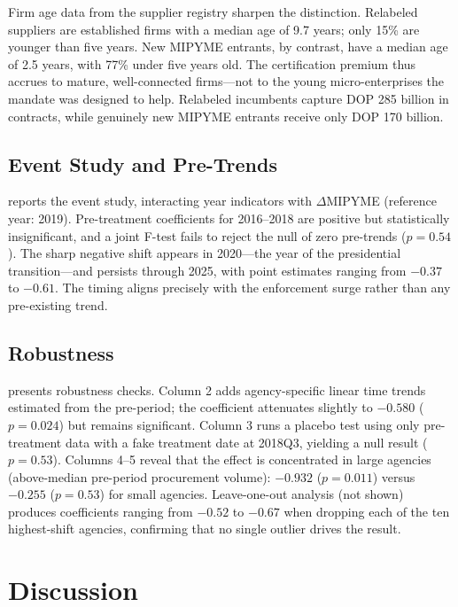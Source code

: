 \documentclass[12pt]{article}
\begin{document}
Firm age data from the supplier registry sharpen the distinction. Relabeled suppliers are established firms with a median age of 9.7 years; only 15\% are younger than five years. New MIPYME entrants, by contrast, have a median age of 2.5 years, with 77\% under five years old. The certification premium thus accrues to mature, well-connected firms---not to the young micro-enterprises the mandate was designed to help. Relabeled incumbents capture DOP 285 billion in contracts, while genuinely new MIPYME entrants receive only DOP 170 billion.

\subsection{Event Study and Pre-Trends}



 reports the event study, interacting year indicators with $\Delta$MIPYME (reference year: 2019). Pre-treatment coefficients for 2016--2018 are positive but statistically insignificant, and a joint F-test fails to reject the null of zero pre-trends ($p = 0.54$). The sharp negative shift appears in 2020---the year of the presidential transition---and persists through 2025, with point estimates ranging from $-0.37$ to $-0.61$. The timing aligns precisely with the enforcement surge rather than any pre-existing trend.

\subsection{Robustness}



 presents robustness checks. Column 2 adds agency-specific linear time trends estimated from the pre-period; the coefficient attenuates slightly to $-0.580$ ($p = 0.024$) but remains significant. Column 3 runs a placebo test using only pre-treatment data with a fake treatment date at 2018Q3, yielding a null result ($p = 0.53$). Columns 4--5 reveal that the effect is concentrated in large agencies (above-median pre-period procurement volume): $-0.932$ ($p = 0.011$) versus $-0.255$ ($p = 0.53$) for small agencies. Leave-one-out analysis (not shown) produces coefficients ranging from $-0.52$ to $-0.67$ when dropping each of the ten highest-shift agencies, confirming that no single outlier drives the result.

\section{Discussion}
\end{document}
